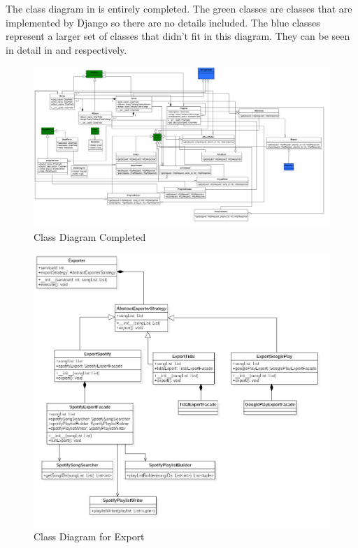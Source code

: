 \documentclass[12pt]{article}
\begin{document}
The class diagram in  is entirely completed. The green classes are classes that are implemented by Django so there are no details included. The blue classes represent a larger set of classes that didn't fit in this diagram. They can be seen in detail in  and  respectively. 
\begin{figure}[H]
	\centering
	\includegraphics[scale=0.25]{DiagramAddedSearch.png}
	\caption{Class Diagram Completed}
	\label{fig:classDiagCompleted}
\end{figure}
\begin{figure}[H]
	\centering
	\includegraphics[scale=0.25]{ExportClassDiagram.png}
	\caption{Class Diagram for Export}
	\label{fig:classDiagExport}
\end{figure}
\end{document}
